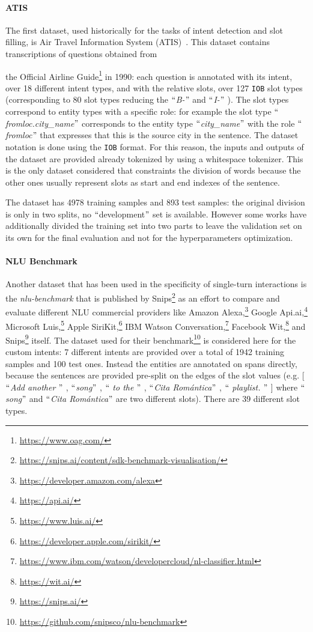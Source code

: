 \paragraph{ATIS}
The first dataset, used historically for the tasks of intent detection and slot filling, is Air Travel Information System (ATIS)~\cite{hemphill1990atis}. This dataset contains transcriptions of questions obtained from

the Official Airline Guide\footnote{\url{https://www.oag.com/}} in 1990: each question is annotated with its intent, over 18 different intent types, and with the relative slots, over 127 \texttt{IOB} slot types (corresponding to 80 slot types reducing the $``$\textit{B-}$"$  and $``$\textit{I-}$"$ ). The slot types correspond to entity types with a specific role: for example the slot type $``$\textit{fromloc.city\_name}$"$  corresponds to the entity type $``$\textit{city\_name}$"$  with the role $``$\textit{fromloc}$"$  that expresses that this is the source city in the sentence. The dataset notation is done using the \texttt{IOB} format. For this reason, the inputs and outputs of the dataset are provided already tokenized by using a whitespace tokenizer. This is the only dataset considered that constraints the division of words because the other ones usually represent slots as start and end indexes of the sentence.

The dataset has 4978 training samples and 893 test samples: the original division is only in two splits, no $``$development$"$  set is available. However some works have additionally divided the training set into two parts to leave the validation set on its own for the final evaluation and not for the hyperparameters optimization.

\paragraph{NLU Benchmark}
Another dataset that has been used in the specificity of single-turn interactions is the \textit{nlu-benchmark} that is published by Snips\footnote{\url{https://snips.ai/content/sdk-benchmark-visualisation/}} as an effort to compare and evaluate different NLU commercial providers like Amazon Alexa,\footnote{\url{https://developer.amazon.com/alexa}} Google Api.ai,\footnote{\url{https://api.ai/}} Microsoft Luis,\footnote{\url{https://www.luis.ai/}} Apple SiriKit,\footnote{\url{https://developer.apple.com/sirikit/}} IBM Watson Conversation,\footnote{\url{https://www.ibm.com/watson/developercloud/nl-classifier.html}} Facebook Wit,\footnote{\url{https://wit.ai/}} and Snips\footnote{\url{https://snips.ai/}} itself. The dataset used for their benchmark\footnote{\url{https://github.com/snipsco/nlu-benchmark}} is considered here for the custom intents: 7 different intents are provided over a total of 1942 training samples and 100 test ones. Instead the entities are annotated on spans directly, because the sentences are provided pre-split on the edges of the slot values (e.g. [$``$\textit{Add another }$"$ , $``$\textit{song}$"$ , $``$\textit{ to the }$"$ , $``$\textit{Cita Romántica}$"$ , $``$\textit{ playlist. }$"$ ] where $``$\textit{song}$"$  and $``$\textit{Cita Romántica}$"$  are two different slots). There are 39 different slot types.

